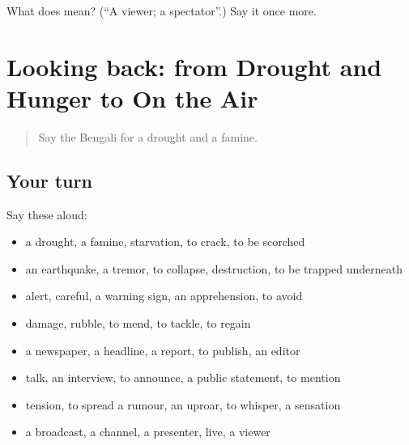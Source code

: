 \begin{tcolorbox}[breakable,colback=teal!4,colframe=teal!35!black,title={Before you move on}]
What does  mean? (\textquotedblleft{}A viewer; a spectator\textquotedblright{}.) Say it once more.
\end{tcolorbox}
\section[(dialogue)]{Looking back: from Drought and Hunger to On the Air}

\label{lesson:BN-R299-review-292-299}



\begin{quote}
Say the Bengali for a drought and a famine.
\end{quote}

\subsection*{Your turn}
Say these aloud:

\begin{itemize}
\raggedright
  \item a drought, a famine, starvation, to crack, to be scorched
  \item an earthquake, a tremor, to collapse, destruction, to be trapped underneath
  \item alert, careful, a warning sign, an apprehension, to avoid
  \item damage, rubble, to mend, to tackle, to regain
  \item a newspaper, a headline, a report, to publish, an editor
  \item talk, an interview, to announce, a public statement, to mention
  \item tension, to spread a rumour, an uproar, to whisper, a sensation
  \item a broadcast, a channel, a presenter, live, a viewer
\end{itemize}

